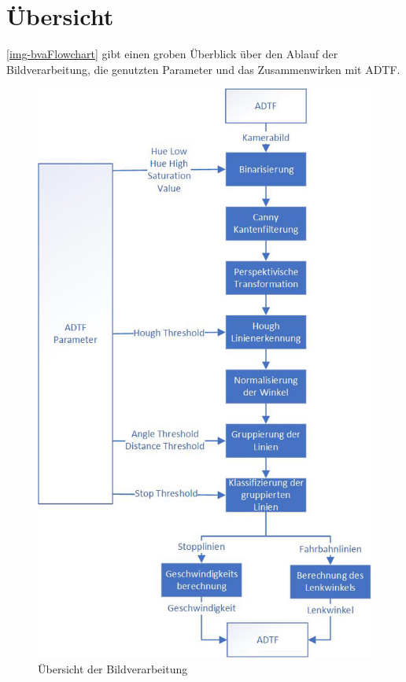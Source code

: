 \documentclass[a4paper,12pt]{report}
\begin{document}
\pagebreak

\section{Übersicht}
	\autoref{img-bvaFlowchart} gibt einen groben Überblick über den Ablauf der Bildverarbeitung, die genutzten Parameter und das Zusammenwirken mit ADTF.

	\begin{figure}[ht]
		\centering
		\includegraphics[width=.6\textwidth,keepaspectratio]{assets/bvaFlowchart.jpg}
		\caption{Übersicht der Bildverarbeitung}
		\label{img-bvaFlowchart}
	\end{figure}

\pagebreak
\end{document}
